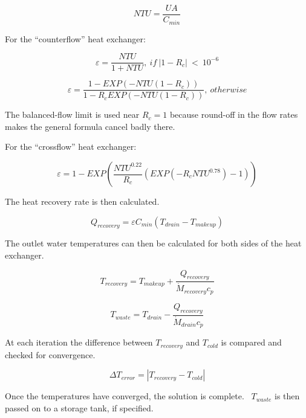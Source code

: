 \begin{equation}
NTU = \frac{{UA}}{{{C_{min}}}}
\end{equation}

For the ``counterflow'' heat exchanger:

\begin{equation}
\varepsilon = \frac{{NTU}}{{1 + NTU}},~if~\left| {1 - {R_c}} \right|~<~{10^{ - 6}}
\end{equation}

\begin{equation}
\varepsilon = \frac{{1 - EXP\left( { - NTU\left( {1 - {R_c}} \right)} \right)}}{{1 - {R_c}EXP\left( { - NTU\left( {1 - {R_c}} \right)} \right)}},~otherwise
\end{equation}

The balanced-flow limit is used near \({R_c} = 1\) because round-off in the flow rates makes the general formula cancel badly there.

For the ``crossflow'' heat exchanger:

\begin{equation}
\varepsilon  = 1 - EXP\left( {\frac{{NT{U^{0.22}}}}{{{R_c}}}\left( {EXP\left( { - {R_c}NT{U^{0.78}}} \right) - 1} \right)} \right)
\end{equation}

The heat recovery rate is then calculated.

\begin{equation}
{Q_{recovery}} = \varepsilon {C_{min}}\left( {{T_{drain}} - {T_{makeup}}} \right)
\end{equation}

The outlet water temperatures can then be calculated for both sides of the heat exchanger.

\begin{equation}
{T_{recovery}} = {T_{makeup}} + \frac{{{Q_{recovery}}}}{{{{\dot M}_{recovery}}{c_p}}}
\end{equation}

\begin{equation}
{T_{waste}} = {T_{drain}} - \frac{{{Q_{recovery}}}}{{{{\dot M}_{drain}}{c_p}}}
\end{equation}

At each iteration the difference between \({T_{recovery}}\) and \({T_{cold}}\) is compared and checked for convergence.

\begin{equation}
\Delta {T_{error}} = \left| {{T_{recovery}} - {T_{cold}}} \right|
\end{equation}

Once the temperatures have converged, the solution is complete.~ \({T_{waste}}\) is then passed on to a storage tank, if specified.
